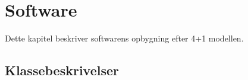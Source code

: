 \documentclass[Main]{subfiles}
\begin{document}
\chapter{Software}
Dette kapitel beskriver softwarens opbygning efter 4+1 modellen. 

\section{Klassebeskrivelser}


\begin{Function}
\end{Function}
\end{document}

